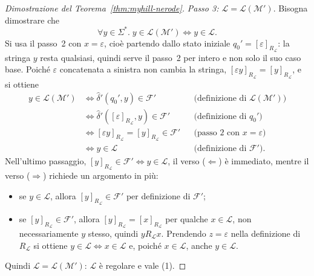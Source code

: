 \documentclass[a4paper, 11pt, oneside]{book}
\theoremstyle{formale}
\begin{document}
\begin{proof}[Dimostrazione del Teorema~\ref{thm:myhill-nerode}]
        \emph{Passo 3: $\mathcal{L} = \mathcal{L}(\mathcal{M}')$}. Bisogna dimostrare che
        \begin{equation*}
            \forall y \in \Sigma^*.\;
            y \in \mathcal{L}(\mathcal{M}') \iff y \in \mathcal{L}.
        \end{equation*}
        Si usa il passo~2 con $x = \varepsilon$, cio\`e partendo dallo stato iniziale
        $q_0' = [\varepsilon]_{R_{\mathcal{L}}}$: la stringa $y$ resta qualsiasi, quindi
        serve il passo~2 per intero e non solo il suo caso base. Poich\'e $\varepsilon$
        concatenata a sinistra non cambia la stringa, $[\varepsilon y]_{R_{\mathcal{L}}} =
        [y]_{R_{\mathcal{L}}}$, e si ottiene
        \begin{align*}
            y \in \mathcal{L}(\mathcal{M}')
                &\iff \hat{\delta}'(q_0', y) \in \mathcal{F}'
                    && \text{(definizione di $\mathcal{L}(\mathcal{M}')$)} \\
                &\iff \hat{\delta}'([\varepsilon]_{R_{\mathcal{L}}}, y) \in \mathcal{F}'
                    && \text{(definizione di $q_0'$)} \\
                &\iff [\varepsilon y]_{R_{\mathcal{L}}} = [y]_{R_{\mathcal{L}}}
                    \in \mathcal{F}'
                    && \text{(passo~2 con $x = \varepsilon$)} \\
                &\iff y \in \mathcal{L}
                    && \text{(definizione di $\mathcal{F}'$)}.
        \end{align*}
        Nell'ultimo passaggio, $[y]_{R_{\mathcal{L}}} \in \mathcal{F}' \iff
        y \in \mathcal{L}$, il verso ($\Leftarrow$) \`e immediato, mentre il verso
        ($\Rightarrow$) richiede un argomento in pi\`u:
        \begin{itemize}[leftmargin=3em]
            \item[($\Leftarrow$)] se $y \in \mathcal{L}$, allora
                $[y]_{R_{\mathcal{L}}} \in \mathcal{F}'$ per definizione di
                $\mathcal{F}'$;
            \item[($\Rightarrow$)] se $[y]_{R_{\mathcal{L}}} \in \mathcal{F}'$, allora
                $[y]_{R_{\mathcal{L}}} = [x]_{R_{\mathcal{L}}}$ per qualche
                $x \in \mathcal{L}$, non necessariamente $y$ stesso, quindi
                $y \mathrel{R_{\mathcal{L}}} x$. Prendendo $z = \varepsilon$ nella
                definizione di $R_{\mathcal{L}}$ si ottiene
                $y \in \mathcal{L} \iff x \in \mathcal{L}$ e, poich\'e
                $x \in \mathcal{L}$, anche $y \in \mathcal{L}$.
        \end{itemize}
        Quindi $\mathcal{L} = \mathcal{L}(\mathcal{M}')$: $\mathcal{L}$ \`e regolare e
        vale (1).
    \end{proof}
\end{document}
